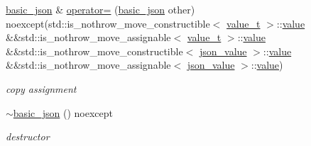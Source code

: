 \begin{DoxyCompactItemize}
\hyperlink{classnlohmann_1_1basic__json}{basic\+\_\+json} \& \hyperlink{classnlohmann_1_1basic__json_a1ae937c299f347a9dcb7f31a8e57762b}{operator=} (\hyperlink{classnlohmann_1_1basic__json}{basic\+\_\+json} other) noexcept(std\+::is\+\_\+nothrow\+\_\+move\+\_\+constructible$<$ \hyperlink{namespacenlohmann_1_1detail_a1ed8fc6239da25abcaf681d30ace4985}{value\+\_\+t} $>$\+::\hyperlink{classnlohmann_1_1basic__json_ac9e014095170d72c4c57e3daf8efc059}{value} \&\&std\+::is\+\_\+nothrow\+\_\+move\+\_\+assignable$<$ \hyperlink{namespacenlohmann_1_1detail_a1ed8fc6239da25abcaf681d30ace4985}{value\+\_\+t} $>$\+::\hyperlink{classnlohmann_1_1basic__json_ac9e014095170d72c4c57e3daf8efc059}{value} \&\&std\+::is\+\_\+nothrow\+\_\+move\+\_\+constructible$<$ \hyperlink{classnlohmann_1_1basic__json_abcfe744b08e2cd81508ce9bf7ebc86cf}{json\+\_\+value} $>$\+::\hyperlink{classnlohmann_1_1basic__json_ac9e014095170d72c4c57e3daf8efc059}{value} \&\&std\+::is\+\_\+nothrow\+\_\+move\+\_\+assignable$<$ \hyperlink{classnlohmann_1_1basic__json_abcfe744b08e2cd81508ce9bf7ebc86cf}{json\+\_\+value} $>$\+::\hyperlink{classnlohmann_1_1basic__json_ac9e014095170d72c4c57e3daf8efc059}{value})
\begin{DoxyCompactList}\small\item\em copy assignment \end{DoxyCompactList}\item 
\hyperlink{classnlohmann_1_1basic__json_a60b643c02a19fa52f99db8215ff58e0f}{$\sim$basic\+\_\+json} () noexcept
\begin{DoxyCompactList}\small\item\em destructor \end{DoxyCompactList}\end{DoxyCompactItemize}
